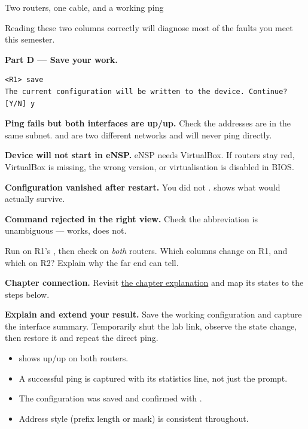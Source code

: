 \begin{labproject}{Two routers, one cable, and a working ping}
\begin{keyidea}
Reading these two columns correctly will diagnose most of the faults you meet this semester.
\end{keyidea}

\medskip\noindent\textbf{Part D --- Save your work.}\par
\begin{lstlisting}[style=utpterminal]
<R1> save
The current configuration will be written to the device. Continue? [Y/N] y
\end{lstlisting}

\begin{troubleshoot}
\textbf{Ping fails but both interfaces are up/up.} Check the addresses are in the same subnet.  and  are two different networks and will never ping directly.

\textbf{Device will not start in eNSP.} eNSP needs VirtualBox. If routers stay red, VirtualBox is missing, the wrong version, or virtualisation is disabled in BIOS.

\textbf{Configuration vanished after restart.} You did not .  shows what would actually survive.

\textbf{Command rejected in the right view.} Check the abbreviation is unambiguous ---  works,  does not.
\end{troubleshoot}

\begin{tryit}
Run  on R1's , then check  on \emph{both} routers. Which columns change on R1, and which on R2? Explain why the far end can tell.
\end{tryit}
\end{labproject}

\textbf{Chapter connection.} Revisit \hyperref[ch:ensp-vrp]{the chapter explanation} and map its states to the steps below.


\begin{verification}
\textbf{Explain and extend your result.} Save the working configuration and capture the interface summary. Temporarily shut the lab link, observe the state change, then restore it and repeat the direct ping.


\begin{itemize}
  \item {} shows up/up on both routers.
  \item A successful ping is captured with its statistics line, not just the prompt.
  \item The configuration was saved and confirmed with .
  \item Address style (prefix length or mask) is consistent throughout.
\end{itemize}
\end{verification}
